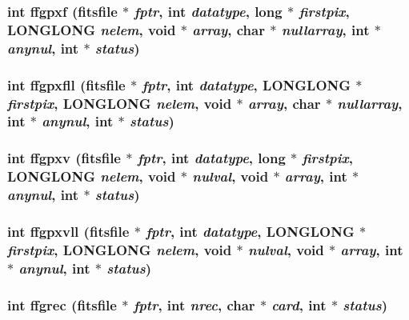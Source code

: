 \subsubsection{\setlength{\rightskip}{0pt plus 5cm}int ffgpxf (\bf{fitsfile} $\ast$ {\em fptr}, int {\em datatype}, long $\ast$ {\em firstpix}, \bf{LONGLONG} {\em nelem}, void $\ast$ {\em array}, char $\ast$ {\em nullarray}, int $\ast$ {\em anynul}, int $\ast$ {\em status})}\label{fitsio_8h_64917e68aaefb305612dd26f21565443}


\subsubsection{\setlength{\rightskip}{0pt plus 5cm}int ffgpxfll (\bf{fitsfile} $\ast$ {\em fptr}, int {\em datatype}, \bf{LONGLONG} $\ast$ {\em firstpix}, \bf{LONGLONG} {\em nelem}, void $\ast$ {\em array}, char $\ast$ {\em nullarray}, int $\ast$ {\em anynul}, int $\ast$ {\em status})}\label{fitsio_8h_1695916e97fed43202efca40fd7fd573}


\subsubsection{\setlength{\rightskip}{0pt plus 5cm}int ffgpxv (\bf{fitsfile} $\ast$ {\em fptr}, int {\em datatype}, long $\ast$ {\em firstpix}, \bf{LONGLONG} {\em nelem}, void $\ast$ {\em nulval}, void $\ast$ {\em array}, int $\ast$ {\em anynul}, int $\ast$ {\em status})}\label{fitsio_8h_bfb2e7a0bf12f295d4907aed0247d9e9}


\subsubsection{\setlength{\rightskip}{0pt plus 5cm}int ffgpxvll (\bf{fitsfile} $\ast$ {\em fptr}, int {\em datatype}, \bf{LONGLONG} $\ast$ {\em firstpix}, \bf{LONGLONG} {\em nelem}, void $\ast$ {\em nulval}, void $\ast$ {\em array}, int $\ast$ {\em anynul}, int $\ast$ {\em status})}\label{fitsio_8h_f79f3c5db73c9029a9adde6aaa91688f}


\subsubsection{\setlength{\rightskip}{0pt plus 5cm}int ffgrec (\bf{fitsfile} $\ast$ {\em fptr}, int {\em nrec}, char $\ast$ {\em card}, int $\ast$ {\em status})}\label{fitsio_8h_bbb72bc1028b323e8ac34baf8e2dc2b4}


